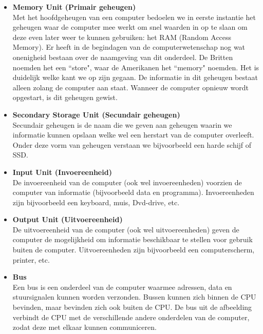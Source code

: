 \begin{itemize}
\begin{itemize}
                  \item[\textbullet] \textit{Registers}\\
                  De registers zijn samen een klein en snel geheugen dat gebruikt wordt voor het opslaan van tussenresultaten en bepaalde besturingsinformatie. Elk register heeft zijn eigen functie en zijn allemaal vaak even groot. Daarnaast kan elk register kan één getal bevatten, met een maximale lengte die bepaald wordt door de grootte van het register. Voorbeelden van registers zijn het register voor de Program Counter en het instructieregister.
              \end{itemize}
    \item[--] \textbf{Memory Unit (Primair geheugen)}\\
              Met het hoofdgeheugen van een computer bedoelen we in eerste instantie het geheugen waar de computer mee werkt om snel waarden in op te slaan om deze even later weer te kunnen gebruiken: het RAM (Random Access Memory). Er heeft in de begindagen van de computerwetenschap nog wat onenigheid bestaan over de naamgeving van dit onderdeel. De Britten noemden het een ``store", waar de Amerikanen het ``memory" noemden. Het is duidelijk welke kant we op zijn gegaan. De informatie in dit geheugen bestaat alleen zolang de computer aan staat. Wanneer de computer opnieuw wordt opgestart, is dit geheugen gewist.
    \item[--] \textbf{Secondary Storage Unit (Secundair geheugen)}\\
              Secundair geheugen is de naam die we geven aan geheugen waarin we informatie kunnen opslaan welke wel een herstart van de computer overleeft. Onder deze vorm van geheugen verstaan we bijvoorbeeld een harde schijf of SSD.
    \item[--] \textbf{Input Unit (Invoereenheid)}\\
              De invoereenheid van de computer (ook wel invoereenheden) voorzien de computer van informatie (bijvoorbeeld data en programma). Invoereenheden zijn bijvoorbeeld een keyboard, muis, Dvd-drive, etc.
    \item[--] \textbf{Output Unit (Uitvoereenheid)}\\
              De uitvoereenheid van de computer (ook wel uitvoereenheden) geven de computer de mogelijkheid om informatie beschikbaar te stellen voor gebruik buiten de computer. Uitvoereenheden zijn bijvoorbeeld een computerscherm, printer, etc.
    \item[--] \textbf{Bus}\\
              Een bus is een onderdeel van de computer waarmee adressen, data en stuursignalen kunnen worden verzonden. Bussen kunnen zich binnen de CPU bevinden, maar bevinden zich ook buiten de CPU. De bus uit de afbeelding verbindt de CPU met de verschillende andere onderdelen van de computer, zodat deze met elkaar kunnen communiceren.
\end{itemize}


